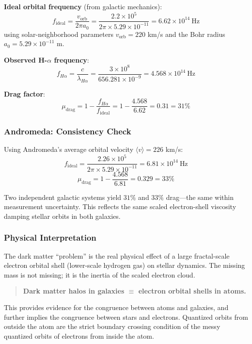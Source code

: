 \documentclass[11pt,a4paper]{article}
\begin{document}
\noindent\textbf{Ideal orbital frequency} (from galactic mechanics):
\[
  f_{\text{ideal}} = \frac{v_{\text{orb}}}{2\pi a_0}
    = \frac{2.2\times10^5}{2\pi\times5.29\times10^{-11}}
    = 6.62\times10^{14}\ \text{Hz}
\]
using solar-neighborhood parameters $v_{\text{orb}}=220$ km/s and the Bohr
radius $a_0=5.29\times10^{-11}$ m.

\noindent\textbf{Observed H-$\alpha$ frequency}:
\[
  f_{H\alpha} = \frac{c}{\lambda_{H\alpha}}
    = \frac{3\times10^8}{656.281\times10^{-9}}
    = 4.568\times10^{14}\ \text{Hz}
\]

\noindent\textbf{Drag factor}:
\[
  \mu_{\text{drag}} = 1 - \frac{f_{H\alpha}}{f_{\text{ideal}}}
    = 1 - \frac{4.568}{6.62} = 0.31 = \boxed{31\%}
\]

\subsubsection{Andromeda: Consistency Check}

Using Andromeda's average orbital velocity $\langle v\rangle = 226$ km/s:
\[
  f_{\text{ideal}} = \frac{2.26\times10^5}{2\pi\times5.29\times10^{-11}}
    = 6.81\times10^{14}\ \text{Hz}
\]
\[
  \mu_{\text{drag}} = 1 - \frac{4.568}{6.81} = 0.329 = \boxed{33\%}
\]

Two independent galactic systems yield $31\%$ and $33\%$ drag---the same within
measurement uncertainty. This reflects the same scaled electron-shell viscosity
damping stellar orbits in both galaxies.

\subsubsection{Physical Interpretation}

The dark matter ``problem'' is the real physical effect of a large fractal-scale
electron orbital shell (lower-scale hydrogen gas) on stellar dynamics. The missing
mass is not missing; it is the inertia of the scaled electron cloud.

\begin{quote}
\textbf{Dark matter halos in galaxies $\equiv$ electron orbital shells in atoms.}
\end{quote}

This provides evidence for the congruence between atoms and galaxies, and further
implies the congruence between stars and electrons. Quantized orbits from outside
the atom are the strict boundary crossing condition of the messy quantized orbits
of electrons from inside the atom.
\end{document}
